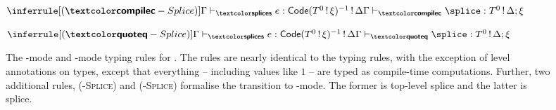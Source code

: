 \begin{figure}
\begin{source-desc}
\begin{center}
\vspace{5mm}

\begin{minipage}[t]{0.5\textwidth}
  \centering
  $\inferrule[(\compilemode{}-Splice)]{\stypejudge[\Gamma]{e}{\textsf{Code}(T^0 \, ! \, \xi)^{-1} \, ! \, \Delta}}{\ctypejudge{\splice}{\runtimecomptype{T}{\Delta ; \xi}}}$
\end{minipage}%
\begin{minipage}[t]{0.5\textwidth}
  \centering
  $\inferrule[(\quotemode{}-Splice)]{\stypejudge[\Gamma]{e}{\textsf{Code}(T^0 \, ! \, \xi)^{-1} \, ! \, \Delta}}{\qtypejudge{\splice}{\runtimecomptype{T}{\Delta ; \xi}}}$
\end{minipage}

\end{center}
\end{source-desc}
\caption{The \compilemode{}-mode and \quotemode{}-mode typing rules for \sourceLang{}. The rules are nearly identical to the \efflang{} typing rules, with the exception of level annotations on types, except that everything -- including values like $1$ -- are typed as compile-time computations. Further, two additional rules, \textsc{(\compilemode{}-Splice)} and \textsc{(\quotemode{}-Splice)} formalise the transition to \splicemode{}-mode. The former is top-level splice and the latter is splice.}%
\label{fig:source-cq-typing-rules}
\end{figure}

